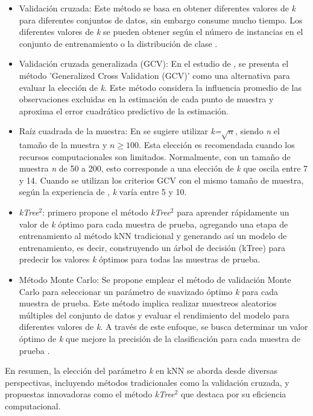 \begin{itemize}
	\item Validación cruzada: Este método se basa en obtener diferentes valores de \textit{k} para diferentes conjuntos de datos, sin embargo consume mucho tiempo. Los diferentes valores de \textit{k} se pueden obtener según el número de instancias en el conjunto de entrenamiento o la distribución de clase \citep{zhang2017efficient}.
	\item Validación cruzada generalizada (GCV): En el estudio de \citep{wahba1975smoothing}, se presenta el método 'Generalized Cross Validation (GCV)' como una alternativa para evaluar la elección de \textit{k}. Este método considera la influencia promedio de las observaciones excluidas en la estimación de cada punto de muestra y aproxima el error cuadrático predictivo de la estimación. 
	\item Raíz cuadrada de la muestra: En \citep{lall1996nearest} se sugiere utilizar \textit{k=}$\sqrt{n}$, siendo \textit{n} el tamaño de la muestra y $n\geq100$. Esta elección es recomendada cuando los recursos computacionales son limitados. Normalmente, con un tamaño de muestra \textit{n} de 50 a 200, esto corresponde a una elección de \textit{k} que oscila entre 7 y 14. Cuando se utilizan los criterios GCV con el mismo tamaño de muestra, según la experiencia de \citep{lall1996nearest}, \textit{k} varía entre 5 y 10. 
	\item \textit{kTree}$^{2}$: \citep{zhang2014predicting} primero propone el método \textit{kTree}$^{2}$ para aprender rápidamente un valor de \textit{k} óptimo para cada muestra de prueba, agregando una etapa de entrenamiento al método kNN tradicional y generando así un modelo de entrenamiento, es decir, construyendo un árbol de decisión (kTree) para predecir los valores \textit{k} óptimos para todas las muestras de prueba.
	\item Método Monte Carlo: Se propone emplear el método de validación Monte Carlo para seleccionar un parámetro de suavizado óptimo \textit{k} para cada muestra de prueba. Este método implica realizar muestreos aleatorios múltiples del conjunto de datos y evaluar el rendimiento del modelo para diferentes valores de \textit{k}. A través de este enfoque, se busca determinar un valor óptimo de \textit{k} que mejore la precisión de la clasificación para cada muestra de prueba \citep{zhang2017efficient}. 
\end{itemize}
En resumen, la elección del parámetro \textit{k} en kNN se aborda desde diversas perspectivas, incluyendo métodos tradicionales como la validación cruzada, y propuestas innovadoras como el método \textit{kTree}$^{2}$ que destaca por su eficiencia computacional. \\

